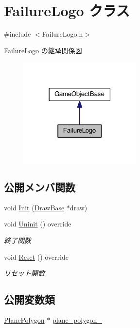 \hypertarget{class_failure_logo}{}\section{Failure\+Logo クラス}
\label{class_failure_logo}


{\ttfamily \#include $<$Failure\+Logo.\+h$>$}



Failure\+Logo の継承関係図\nopagebreak
\begin{figure}[H]
\begin{center}
\leavevmode
\includegraphics[width=174pt]{class_failure_logo__inherit__graph}
\end{center}
\end{figure}
\subsection*{公開メンバ関数}
\begin{DoxyCompactItemize}
\item 
void \mbox{\hyperlink{class_failure_logo_a22da89def55023f43860cf646da7a74c}{Init}} (\mbox{\hyperlink{class_draw_base}{Draw\+Base}} $\ast$draw)
\item 
void \mbox{\hyperlink{class_failure_logo_adbe01fc4567ade0e788f511f5162299c}{Uninit}} () override
\begin{DoxyCompactList}\small\item\em 終了関数 \end{DoxyCompactList}\item 
void \mbox{\hyperlink{class_failure_logo_a542b1617087a6701f7edb345e2a72e01}{Reset}} () override
\begin{DoxyCompactList}\small\item\em リセット関数 \end{DoxyCompactList}\end{DoxyCompactItemize}
\subsection*{公開変数類}
\begin{DoxyCompactItemize}
\item 
\mbox{\hyperlink{class_plane_polygon}{Plane\+Polygon}} $\ast$ \mbox{\hyperlink{class_failure_logo_ab41feac9836e9687c75546098ff8f53c}{plane\+\_\+polygon\+\_\+}}
\end{DoxyCompactItemize}
